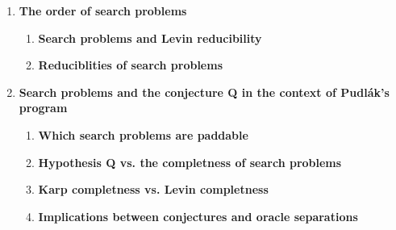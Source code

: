 \documentclass[nofonts]{uebung}
\begin{document}
\begin{english}
\begin{enumerate}[label*=\arabic*.]
    \item \textbf{The order of search problems}
        \begin{enumerate}[label*=\arabic*.]
            \item \textbf{Search problems and Levin reducibility}
            \item \textbf{Reduciblities of search problems}
        \end{enumerate}
    \item \textbf{Search problems and the conjecture Q in the context of Pudlák's program}
        \begin{enumerate}[label*=\arabic*.]
            \item \textbf{Which search problems are paddable}
            \item \textbf{Hypothesis Q vs. the completness of search problems}
            \item \textbf{Karp completness vs. Levin completness}
            \item \textbf{Implications between conjectures and oracle separations}
        \end{enumerate}
\end{enumerate}
\end{english}
\end{document}
